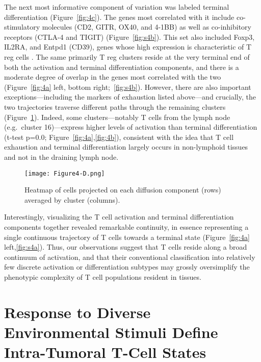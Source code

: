 The next most informative component of variation was labeled terminal differentiation (Figure~\ref{fig:4c}). 
The genes most correlated with it include co-stimulatory molecules (CD2, GITR, OX40, and 4-1BB) as well as co-inhibitory receptors (CTLA-4 and TIGIT) (Figure~\ref{fig:s4b}).
This set also included Foxp3, IL2RA, and Entpd1 (CD39), genes whose high expression is characteristic of T reg cells \citep{Josefowicz2012}.
The same primarily T reg clusters reside at the very terminal end of both the activation and terminal differentiation components, and there is a moderate degree of overlap in the genes most correlated with the two (Figure~\ref{fig:4a} left, bottom right;~\ref{fig:s4b}).
However, there are also important exceptions---including the markers of exhaustion listed above---and crucially, the two trajectories traverse different paths through the remaining clusters (Figure~\ref{fig:4d}).
Indeed, some clusters---notably T cells from the lymph node (e.g.\ cluster 16)---express higher levels of activation than terminal differentiation (t-test p=0.0; Figure~\ref{fig:4a},\ref{fig:4b}), consistent with the idea that T cell exhaustion and terminal differentiation largely occurs in non-lymphoid tissues and not in the draining lymph node.

\begin{figure}
\centering
\texttt{[image: Figure4-D.png]}
\caption{Heatmap of cells projected on each diffusion component (rows) averaged by cluster (columns).
}
\label{fig:4d}
\end{figure}

Interestingly, visualizing the T cell activation and terminal differentiation components together revealed remarkable continuity, in essence representing a single continuous trajectory of T cells towards a terminal state (Figure~\ref{fig:4a} left,\ref{fig:s4a}).
Thus, our observations suggest that T cells reside along a broad continuum of activation, and that their conventional classification into relatively few discrete activation or differentiation subtypes may grossly oversimplify the phenotypic complexity of T cell populations resident in tissues.

\section{Response to Diverse Environmental Stimuli Define Intra-Tumoral T-Cell States}

